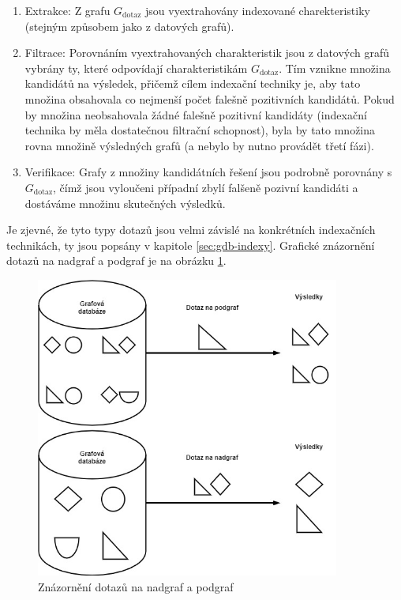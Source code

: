 \begin{enumerate}
	\item{Extrakce:} Z grafu \textit{$G_\mathrm{dotaz}$} jsou vyextrahovány indexované charekteristiky (stejným způsobem jako z datových grafů).
	\item{Filtrace:} Porovnáním vyextrahovaných charakteristik jsou z datových grafů vybrány ty, které odpovídají charakteristikám \textit{$G_\mathrm{dotaz}$}. Tím vznikne množina kandidátů na výsledek, přičemž cílem indexační techniky je, aby tato množina obsahovala co nejmenší počet falešně pozitivních kandidátů. Pokud by množina neobsahovala žádné falešně pozitivní kandidáty (indexační technika by měla dostatečnou filtrační schopnost), byla by tato množina rovna množině výsledných grafů (a nebylo by nutno provádět třetí fázi). 
	\item{Verifikace:} Grafy z množiny kandidátních řešení jsou podrobně porovnány s \textit{$G_\mathrm{dotaz}$}, čímž jsou vyloučeni případní zbylí falšeně pozivní kandidáti a dostáváme množinu skutečných výsledků. 
\end{enumerate}

Je zjevné, že tyto typy dotazů jsou velmi závislé na konkrétních indexačních technikách, ty jsou popsány v kapitole \ref{sec:gdb-indexy}. Grafické znázornění dotazů na nadgraf a podgraf je na obrázku \ref{fig:supergraph_subgraph_query}.

\begin{figure}
\begin{center}
\includegraphics[width=10cm]{figures/supergraph_subgraph_query}
\caption{Znázornění dotazů na nadgraf a podgraf}
\label{fig:supergraph_subgraph_query}
\end{center}
\end{figure}

